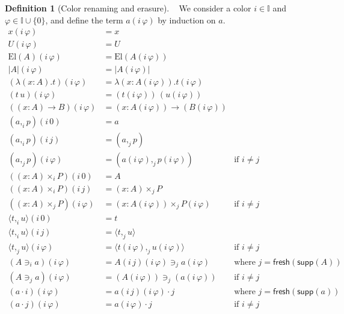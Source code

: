 \documentclass[english]{PaperTools/latex/entcs}
\theoremstyle{plain}
\theoremstyle{definition}
\newtheorem{definition}[theorem]{Definition}
\theoremstyle{remark}
\newcommand\CP[3]{(#2,_{#1} #3)}
\newcommand\CTimes[2]{(#2) ×_{#1}}
\newcommand\op[1]{∋_{#1}}
\newcommand\fp[3]{⟨#2 ,_{#1} #3⟩}
\newcommand\mor[2]{({#1}\,{#2})}
\def\fresh#1{\mathsf{fresh}(#1)}
\def\support#1{\mathsf{supp}(#1)}
\def\El#1{\mathrm{El}(#1)}
\begin{document}
\begin{definition}[Color renaming and erasure]~
  \label{def:color-erasure}
  We consider a color $i ∈ 𝕀$ and $φ ∈ 𝕀 ∪ \{0\}$,
  and define the term $a(i\,φ)$ by induction on $a$.
\begin{align*}
  x \mor{i}{φ} & = x \\
  U \mor{i}{φ} & = U \\
  \El{A} \mor{i}{φ} & = \El {A\mor{i}{φ}} \\
  |A| \mor{i}{φ} & = |A\mor{i}{φ}| \\
  (λ(x:A).t)\mor{i}{φ} &= λ(x:A\mor{i}{φ}).t\mor{i}{φ} \\
  (t\,u)\mor{i}{φ} &= (t\mor{i}{φ}) \, (u\mor{i}{φ}) \\
  ((x:A)→B)\mor{i}{φ} &= (x:A\mor{i}{φ})→(B\mor{i}{φ}) \\
  {\CP {i} a p}\mor{i}{0} &= a \\
  {\CP {i} a p}\mor{i}{j} &= \CP {j} a p \\
  {\CP {j} a p}\mor{i}{φ} &= \CP {j} {a\mor{i}{φ}} {p\mor{i}{φ}} &\text{if $i ≠ j$} \\
  (\CTimes {i} {x:A} P)\mor{i}{0} &= A \\
  (\CTimes {i} {x:A} P)\mor{i}{j} &= \CTimes {j} {x:A} P \\
  (\CTimes {j} {x:A} P)\mor{i}{φ} &= \CTimes {j} {x:A\mor{i}{φ}} {P\mor{i}{φ}} &\text{if $i ≠ j$} \\
  {\fp {i} t u}\mor{i}{0} &= t \\
  {\fp {i} t u}\mor{i}{j} &= \fp {j} t u \\
  {\fp {j} t u}\mor{i}{φ} &= \fp {j} {t\mor{i}{φ}} {u\mor{i}{φ}} &\text{if $i ≠ j$} \\
  (A \op {i} a)\mor{i}{φ} &= {A\mor{i}{j}\mor{i}{φ}} \op {j} {a\mor{i}{φ}} &\text{where $j = \fresh{\support A}$} \\
  (A \op {j} a)\mor{i}{φ} &= (A\mor{i}{φ}) \op {j} (a\mor{i}{φ}) &\text{if $i ≠ j$} \\
%
  (a · i)\mor{i}{φ} &= a \mor{i}{j}\mor{i}{φ} · j &\text{where $j = \fresh{\support a}$} \\
  (a · j)\mor{i}{φ} &= a\mor{i}{φ} · j &\text{if $i ≠ j$} \\
  \end{align*}
\end{definition}
\end{document}
